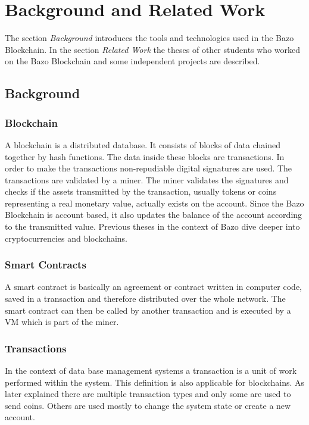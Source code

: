 \chapter{Background and Related Work}
\thispagestyle{main} %

The section \textit{Background} introduces the tools and technologies used in the Bazo Blockchain. In the section \textit{Related Work} the theses of other students who worked on the Bazo Blockchain and some independent projects are described.

\section{Background}
\subsection{Blockchain}
A blockchain is a distributed database. It consists of blocks of data chained together by hash functions. The data inside these blocks are transactions. In order to make the transactions non-repudiable digital signatures are used. The transactions are validated by a miner. The miner validates the signatures and checks if the assets transmitted by the transaction, usually tokens or coins representing a real monetary value, actually exists on the account. Since the Bazo Blockchain is account based, it also updates the balance of the account according to the transmitted value. Previous theses in the context of Bazo dive deeper into cryptocurrencies and blockchains. \cite{ba_miner} \cite{ba_client} 

\subsection{Smart Contracts}
A smart contract is basically an agreement or contract written in computer code, saved in a transaction and therefore distributed over the whole network. The smart contract can then be called by another transaction and is executed by a VM which is part of the miner.

\subsection{Transactions}
In the context of data base management systems a transaction is a unit of work performed within the system. \cite{dbtransaction} This definition is also applicable for blockchains. As later explained there are multiple transaction types and only some are used to send coins. Others are used mostly to change the system state or create a new account.

